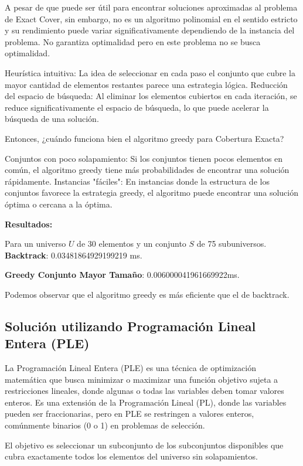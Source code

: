 \documentclass{article}
\begin{document}
A pesar de que puede ser útil para encontrar soluciones aproximadas al problema de Exact Cover, sin embargo, no es un algoritmo polinomial en el sentido estricto y su rendimiento puede variar significativamente dependiendo de la instancia del problema.
No garantiza optimalidad pero en este problema no se busca optimalidad.

Heurística intuitiva: La idea de seleccionar en cada paso el conjunto que cubre la mayor cantidad de elementos restantes parece una estrategia lógica.
Reducción del espacio de búsqueda: Al eliminar los elementos cubiertos en cada iteración, se reduce significativamente el espacio de búsqueda, lo que puede acelerar la búsqueda de una solución.

Entonces, ¿cuándo funciona bien el algoritmo greedy para Cobertura Exacta?

Conjuntos con poco solapamiento: Si los conjuntos tienen pocos elementos en común, el algoritmo greedy tiene más probabilidades de encontrar una solución rápidamente.
Instancias "fáciles": En instancias donde la estructura de los conjuntos favorece la estrategia greedy, el algoritmo puede encontrar una solución óptima o cercana a la óptima.

\textbf{Resultados:}

Para un universo \(U\) de 30 elementos y un conjunto \(S\) de 75 subuniversos. \\

\textbf{Backtrack}: 0.03481864929199219 ms.

\textbf{Greedy Conjunto Mayor Tamaño}: 0.006000041961669922ms.

Podemos observar que el algoritmo greedy es más eficiente que el de backtrack.

\subsection{Solución utilizando Programación Lineal Entera (PLE)}

La Programación Lineal Entera (PLE) es una técnica de optimización matemática que busca minimizar o maximizar una función objetivo sujeta a restricciones lineales, donde algunas o todas las variables deben tomar valores enteros. Es una extensión de la Programación Lineal (PL), donde las variables pueden ser fraccionarias, pero en PLE se restringen a valores enteros, comúnmente binarios (0 o 1) en problemas de selección.

El objetivo es seleccionar un subconjunto de los subconjuntos disponibles que cubra exactamente todos los elementos del universo sin solapamientos.
\end{document}
